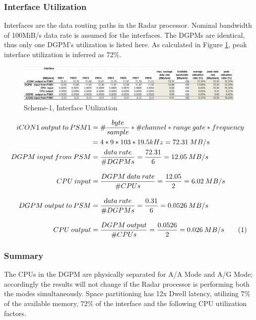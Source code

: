 \subsubsection{Interface Utilization}
\label{sec:scheme1:aa_interface_util}
Interfaces are the data routing paths in the Radar processor. Nominal bandwidth of 100MiB/s data rate is assumed for the interfaces. The DGPMs are identical, thus only one DGPM's utilization is listed here. As calculated in Figure \ref{fig:existing_analysis:aa_scheme1_interface_util}, peak interface utilization is inferred as 72\%.
\begin{figure}[h!]
	\centering
	\includegraphics[width=160mm]{figures/aa_scheme1_interface_util}
	\caption{Scheme-1, Interface Utilization}
	\label{fig:existing_analysis:aa_scheme1_interface_util}
\end{figure}

\begin{align*}
	\label{equ:aa:scheme1:interface_util}
	iCON1 \: output \: to \: PSM1 &= \#\frac{byte}{sample} * \#channel * range \: gate * frequency \\
	&= 4 * 9 * 103 * 19.5kHz = 72.31 \: MB/s \\
	DGPM \: input \: from \: PSM &= \frac{data \: rate}{\#DGPMs} = \frac{72.31}{6} = 12.05 \: MB/s \\[0.3cm]
	CPU \: input &= \frac{DGPM \: data \: rate}{\#CPUs} = \frac{12.05}{2} = 6.02 \: MB/s \\[0.3cm]
	DGPM \: output \: to \: PSM &= \frac{data \: rate}{\#DGPMs} = \frac{0.31}{6} = 0.0526 \: MB/s \\[0.3cm]
	CPU \: output &= \frac{DGPM \: output}{\#CPUs} = \frac{0.0526}{2} = 0.026 \: MB/s \stepcounter{equation}\tag{\theequation}
\end{align*}
\FloatBarrier

\subsubsection{Summary}
The CPUs in the DGPM are physically separated for A/A Mode and A/G Mode; accordingly the results will not change if the Radar processor is performing both the modes simultaneously. Space partitioning has 12x Dwell latency, utilizing 7\% of the available memory, 72\% of the interface and the following CPU utilization factors.

